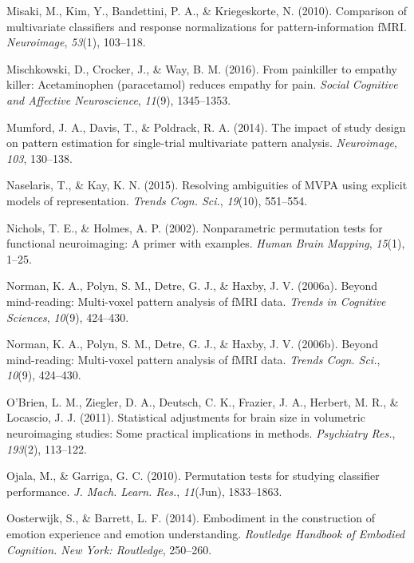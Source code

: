 \documentclass[12pt,american,a4paper,oneside,]{memoir} %
\begin{document}
\leavevmode\hypertarget{ref-misaki2010comparison}{}%
Misaki, M., Kim, Y., Bandettini, P. A., \& Kriegeskorte, N. (2010). Comparison of multivariate classifiers and response normalizations for pattern-information fMRI. \emph{Neuroimage}, \emph{53}(1), 103--118.

\leavevmode\hypertarget{ref-mischkowski2016painkiller}{}%
Mischkowski, D., Crocker, J., \& Way, B. M. (2016). From painkiller to empathy killer: Acetaminophen (paracetamol) reduces empathy for pain. \emph{Social Cognitive and Affective Neuroscience}, \emph{11}(9), 1345--1353.

\leavevmode\hypertarget{ref-mumford2014impact}{}%
Mumford, J. A., Davis, T., \& Poldrack, R. A. (2014). The impact of study design on pattern estimation for single-trial multivariate pattern analysis. \emph{Neuroimage}, \emph{103}, 130--138.

\leavevmode\hypertarget{ref-Naselaris2015-jn}{}%
Naselaris, T., \& Kay, K. N. (2015). Resolving ambiguities of MVPA using explicit models of representation. \emph{Trends Cogn. Sci.}, \emph{19}(10), 551--554.

\leavevmode\hypertarget{ref-nichols2002nonparametric}{}%
Nichols, T. E., \& Holmes, A. P. (2002). Nonparametric permutation tests for functional neuroimaging: A primer with examples. \emph{Human Brain Mapping}, \emph{15}(1), 1--25.

\leavevmode\hypertarget{ref-norman2006beyond}{}%
Norman, K. A., Polyn, S. M., Detre, G. J., \& Haxby, J. V. (2006a). Beyond mind-reading: Multi-voxel pattern analysis of fMRI data. \emph{Trends in Cognitive Sciences}, \emph{10}(9), 424--430.

\leavevmode\hypertarget{ref-Norman2006-bt}{}%
Norman, K. A., Polyn, S. M., Detre, G. J., \& Haxby, J. V. (2006b). Beyond mind-reading: Multi-voxel pattern analysis of fMRI data. \emph{Trends Cogn. Sci.}, \emph{10}(9), 424--430.

\leavevmode\hypertarget{ref-OBrien2011-lj}{}%
O'Brien, L. M., Ziegler, D. A., Deutsch, C. K., Frazier, J. A., Herbert, M. R., \& Locascio, J. J. (2011). Statistical adjustments for brain size in volumetric neuroimaging studies: Some practical implications in methods. \emph{Psychiatry Res.}, \emph{193}(2), 113--122.

\leavevmode\hypertarget{ref-Ojala2010-rc}{}%
Ojala, M., \& Garriga, G. C. (2010). Permutation tests for studying classifier performance. \emph{J. Mach. Learn. Res.}, \emph{11}(Jun), 1833--1863.

\leavevmode\hypertarget{ref-oosterwijk2014embodiment}{}%
Oosterwijk, S., \& Barrett, L. F. (2014). Embodiment in the construction of emotion experience and emotion understanding. \emph{Routledge Handbook of Embodied Cognition. New York: Routledge}, 250--260.
\end{document}
